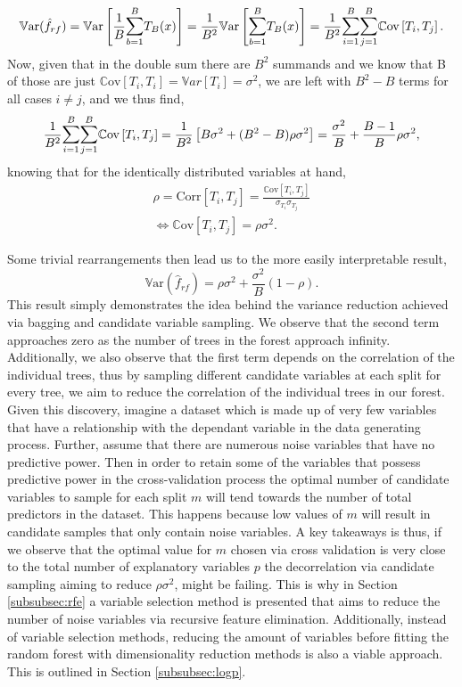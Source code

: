 \documentclass[a4paper,12pt, headsepline]{scrartcl}
\numberwithin{equation}{section}
\begin{document}
 \[
 \mathbb{V}\text{ar}(\hat f_{rf}) = \mathbb{V}\text{ar} \left[ \frac{1}{B} \mathlarger{\sum}\limits_{b = 1}^B T_B(x) \right] = \frac{1}{B^2} \mathbb{V}\text{ar} \left[ \mathlarger{\sum}\limits_{b = 1}^B T_B(x) \right] = \frac{1}{B^2} \mathlarger{\sum}\limits_{i = 1}^B \mathlarger{\sum}\limits_{j = 1}^B \mathbb{C}\text{ov} \left[T_i, T_j \right].
 \]
Now, given that in the double sum there are $B^2$ summands and we know that B of those are just $\mathbb{C}\text{ov}\left[T_i, T_i \right] = \mathbb{V}ar\left[T_i\right] = \sigma^2$, we are left with $B^2 - B$ terms for all cases $i \neq j$, and we thus find,
\[
\frac{1}{B^2} \mathlarger{\sum}\limits_{i = 1}^B \mathlarger{\sum}\limits_{j = 1}^B \mathbb{C}\text{ov} \left[T_i, T_j \right] = \frac{1}{B^2} \left[B\sigma^2 + (B^2 - B)\rho\sigma^2 \right] = \frac{\sigma^2}{B} +  \frac{B - 1}{B}\rho\sigma^2,
\]
knowing that for the identically distributed variables at hand,
\begin{gather*}
	\rho = \text{Corr}\left[T_i, T_j\right] =  \frac{\mathbb{C}\text{ov}\left[T_i, T_j \right]}{\sigma_{T_i}\sigma_{T_j}}\\
	\iff \mathbb{C}\text{ov}\left[T_i, T_j \right] = \rho\sigma^2.
\end{gather*}

Some trivial rearrangements then lead us to the more easily interpretable result,
\[
\mathbb{V}\text{ar}(\hat f_{rf}) = \rho\sigma^2 + \frac{\sigma^2}{B}(1 - \rho).
\]
This result simply demonstrates the idea behind the variance reduction achieved via bagging and candidate variable sampling. We observe that the second term approaches zero as the number of trees in the forest approach infinity. Additionally, we also observe that the first term depends on the correlation of the individual trees, thus by sampling different candidate variables at each split for every tree, we aim to reduce the correlation of the individual trees in our forest.\\
Given this discovery, imagine a dataset which is made up of very few variables that have a relationship with the dependant variable in the data generating process. Further, assume that there are numerous noise variables that have no predictive power. Then in order to retain some of the variables that possess predictive power in the cross-validation process the optimal number of candidate variables to sample for each split $m$ will tend towards the number of total predictors in the dataset. This happens because low values of $m$ will result in candidate samples that only contain noise variables. A key takeaways is thus, if we observe that the optimal value for $m$ chosen via cross validation is very close to the total number of explanatory variables $p$ the decorrelation via candidate sampling aiming to reduce $\rho\sigma^2$, might be failing. This is why in Section \ref{subsubsec:rfe} a variable selection method is presented that aims to reduce the number of noise variables via recursive feature elimination. Additionally, instead of variable selection methods, reducing the amount of variables before fitting the random forest with dimensionality reduction methods is also a viable approach. This is outlined in Section \ref{subsubsec:logp}.
\end{document}
